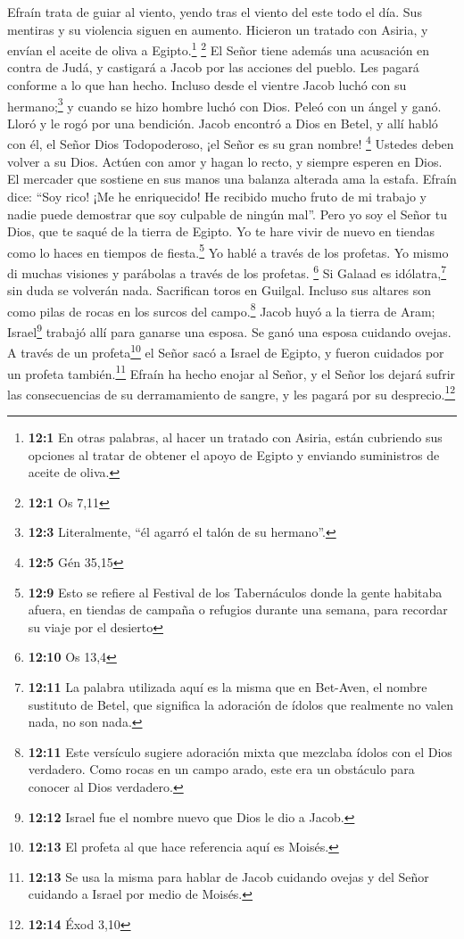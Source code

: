  Efraín trata de guiar al viento, yendo tras el viento del
este todo el día. Sus mentiras y su violencia siguen en aumento.
Hicieron un tratado con Asiria, y envían el aceite de oliva a
Egipto.\footnote{\textbf{12:1} En otras palabras, al hacer un tratado
  con Asiria, están cubriendo sus opciones al tratar de obtener el apoyo
  de Egipto y enviando suministros de aceite de oliva.} \footnote{\textbf{12:1}
  Os 7,11}  El Señor tiene además una acusación en contra
de Judá, y castigará a Jacob por las acciones del pueblo. Les pagará
conforme a lo que han hecho.  Incluso desde el vientre
Jacob luchó con su hermano;\footnote{\textbf{12:3} Literalmente, ``él
  agarró el talón de su hermano''.} y cuando se hizo hombre luchó con
Dios.  Peleó con un ángel y ganó. Lloró y le rogó por una
bendición. Jacob encontró a Dios en Betel, y allí habló con él,
 el Señor Dios Todopoderoso, ¡el Señor es su gran nombre!
\footnote{\textbf{12:5} Gén 35,15}  Ustedes deben volver a
su Dios. Actúen con amor y hagan lo recto, y siempre esperen en Dios.
 El mercader que sostiene en sus manos una balanza
alterada ama la estafa.  Efraín dice: ``Soy rico! ¡Me he
enriquecido! He recibido mucho fruto de mi trabajo y nadie puede
demostrar que soy culpable de ningún mal''.  Pero yo soy
el Señor tu Dios, que te saqué de la tierra de Egipto. Yo te hare vivir
de nuevo en tiendas como lo haces en tiempos de fiesta.\footnote{\textbf{12:9}
  Esto se refiere al Festival de los Tabernáculos donde la gente
  habitaba afuera, en tiendas de campaña o refugios durante una semana,
  para recordar su viaje por el desierto}  Yo hablé a
través de los profetas. Yo mismo di muchas visiones y parábolas a través
de los profetas. \footnote{\textbf{12:10} Os 13,4}  Si
Galaad es idólatra,\footnote{\textbf{12:11} La palabra utilizada aquí es
  la misma que en Bet-Aven, el nombre sustituto de Betel, que significa
  la adoración de ídolos que realmente no valen nada, no son nada.} sin
duda se volverán nada. Sacrifican toros en Guilgal. Incluso sus altares
son como pilas de rocas en los surcos del campo.\footnote{\textbf{12:11}
  Este versículo sugiere adoración mixta que mezclaba ídolos con el Dios
  verdadero. Como rocas en un campo arado, este era un obstáculo para
  conocer al Dios verdadero.}  Jacob huyó a la tierra de
Aram; Israel\footnote{\textbf{12:12} Israel fue el nombre nuevo que Dios
  le dio a Jacob.} trabajó allí para ganarse una esposa. Se ganó una
esposa cuidando ovejas.  A través de un
profeta\footnote{\textbf{12:13} El profeta al que hace referencia aquí
  es Moisés.} el Señor sacó a Israel de Egipto, y fueron cuidados por un
profeta también.\footnote{\textbf{12:13} Se usa la misma para hablar de
  Jacob cuidando ovejas y del Señor cuidando a Israel por medio de
  Moisés.}  Efraín ha hecho enojar al Señor, y el Señor
los dejará sufrir las consecuencias de su derramamiento de sangre, y les
pagará por su desprecio.\footnote{\textbf{12:14} Éxod 3,10}

